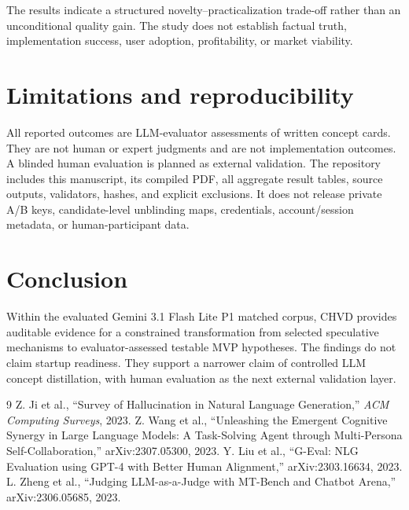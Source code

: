 \documentclass[11pt]{article}
\newcommand{\chvd}{\textsc{CHVD}}
\begin{document}
The results indicate a structured novelty--practicalization trade-off rather than an
unconditional quality gain. The study does not establish factual truth, implementation
success, user adoption, profitability, or market viability.

\section{Limitations and reproducibility}
All reported outcomes are LLM-evaluator assessments of written concept cards. They
are not human or expert judgments and are not implementation outcomes. A blinded human
evaluation is planned as external validation. The repository includes this manuscript,
its compiled PDF, all aggregate result tables, source outputs, validators, hashes,
and explicit exclusions. It does not release private A/B keys, candidate-level
unblinding maps, credentials, account/session metadata, or human-participant data.

\section{Conclusion}
Within the evaluated Gemini 3.1 Flash Lite P1 matched corpus, \chvd{} provides
auditable evidence for a constrained transformation from selected speculative
mechanisms to evaluator-assessed testable MVP hypotheses. The findings do not claim
startup readiness. They support a narrower claim of controlled LLM concept
distillation, with human evaluation as the next external validation layer.

\begin{thebibliography}{9}
 Z. Ji et al., ``Survey of Hallucination in Natural Language Generation,'' \textit{ACM Computing Surveys}, 2023.
 Z. Wang et al., ``Unleashing the Emergent Cognitive Synergy in Large Language Models: A Task-Solving Agent through Multi-Persona Self-Collaboration,'' arXiv:2307.05300, 2023.
 Y. Liu et al., ``G-Eval: NLG Evaluation using GPT-4 with Better Human Alignment,'' arXiv:2303.16634, 2023.
 L. Zheng et al., ``Judging LLM-as-a-Judge with MT-Bench and Chatbot Arena,'' arXiv:2306.05685, 2023.
\end{thebibliography}
\end{document}
